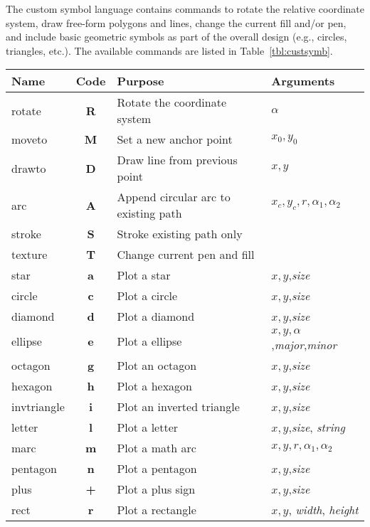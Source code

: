 The custom symbol language contains commands to rotate the relative coordinate system,
draw free-form polygons and lines, change the current fill and/or pen, and include basic
geometric symbols as part of the overall design (e.g., circles, triangles, etc.).
The available commands are listed in
Table~\ref{tbl:custsymb}.
\begin{table}[H]
\small
\centering
\begin{tabular}{lcll} \hline
\textbf{Name} 	& 	\textbf{Code}	&	\textbf{Purpose}		& \textbf{Arguments} \\ \hline \hline
rotate		&	\textbf{R}	& Rotate the coordinate system		& $\alpha$ \\
moveto		&	\textbf{M}	& Set a new anchor point 		& $x_0, y_0$  \\
drawto		&	\textbf{D}	& Draw line from previous point 	& $x, y$  \\
arc		&	\textbf{A}	& Append circular arc to existing path 	& $x_c, y_c, r, \alpha_1, \alpha_2$  \\
stroke		&	\textbf{S}	& Stroke existing path only 		&  \\ \hline
texture		&	\textbf{T}	& Change current pen and fill		&  \\ \hline
star		&	\textbf{a}	& Plot a star 				& $x, y$,\emph{size}  \\
circle		&	\textbf{c}	& Plot a circle 			& $x, y$,\emph{size}  \\
diamond		&	\textbf{d}	& Plot a diamond 			& $x, y$,\emph{size}  \\
ellipse		&	\textbf{e}	& Plot a ellipse 			& $x, y, \alpha$,\emph{major},\emph{minor}  \\
octagon		&	\textbf{g}	& Plot an octagon 			& $x, y$,\emph{size}  \\
hexagon		&	\textbf{h}	& Plot a hexagon 			& $x, y$,\emph{size}  \\
invtriangle	&	\textbf{i}	& Plot an inverted triangle		& $x, y$,\emph{size}  \\
letter		&	\textbf{l}	& Plot a letter 			& $x, y$,\emph{size}, \emph{string}  \\
marc		&	\textbf{m}	& Plot a math arc 			& $x, y, r, \alpha_1, \alpha_2$  \\
pentagon	&	\textbf{n}	& Plot a pentagon 			& $x, y$,\emph{size}  \\
plus		&	\textbf{+}	& Plot a plus sign 			& $x, y$,\emph{size}  \\
rect		&	\textbf{r}	& Plot a rectangle 			& $x, y$, \emph{width}, \emph{height}  \\

\end{tabular}
\end{table}
